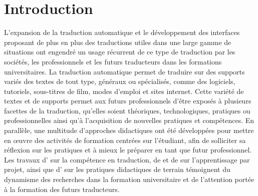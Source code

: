\documentclass[french]{textolivre}
\begin{document}
\section{Introduction}\label{sec-intro}
L’expansion de la traduction automatique et le développement des interfaces proposant de plus en plus des traductions utiles dans une large gamme de situations ont engendré un usage récurrent de ce type de traduction par les sociétés, les professionnels et les futurs traducteurs dans les formations universitaires. La traduction automatique permet de traduire sur des supports variés des textes de tout type, généraux ou spécialisés, comme des logiciels, tutoriels, sous-titres de film, modes d’emploi et sites internet. Cette variété de textes et de supports permet aux futurs professionnels d’être exposés à plusieurs facettes de la traduction, qu’elles soient théoriques, technologiques, pratiques ou professionnelles \cite[p.~216]{orlando_training_2019} ainsi qu’à l’acquisition de nouvelles pratiques et compétences. En parallèle, une multitude d’approches didactiques ont été développées pour mettre en œuvre des activités de formation centrées sur l’étudiant, afin de solliciter sa réflexion sur les pratiques et à mieux le préparer en tant que futur professionnel.  Les travaux d’\textcite{hurtado_albir_competence-based_2007, hurtado_albir_acquisition_2015} sur la compétence en traduction, de \textcite{kiraly_project-based_2006, kiraly_growing_2012, kiraly_authentic_2016} et de \textcite{kandeel_development_2019} sur l’apprentissage par projet, ainsi que d’\textcite{hubscher-davidson_reflection_2008} sur les pratiques didactiques de terrain témoignent du dynamisme des recherches dans la formation universitaire et de l’attention portée à la formation des futurs traducteurs. 
\end{document}
